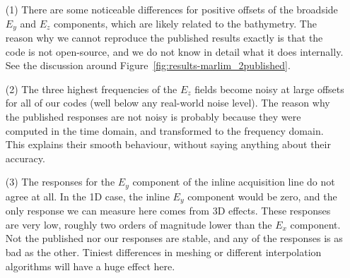 \documentclass[extra, camera,%
]{gji}
\begin{document}
\begin{enumerate}
  \item[(1)] There are some noticeable differences for positive offsets of the broadside $E_y$ and $E_z$ components, which are likely related to the bathymetry. The reason why we cannot reproduce the published results exactly is that the code is not open-source, and we do not know in detail what it does internally. See the discussion around Figure~\ref{fig:results-marlim_2published}.
  \item[(2)] The three highest frequencies of the $E_z$ fields become noisy at large offsets for all of our codes (well below any real-world noise level). The reason why the published responses are not noisy is probably because they were computed in the time domain, and transformed to the frequency domain. This explains their smooth behaviour, without saying anything about their accuracy.
  \item[(3)] The responses for the $E_y$ component of the inline acquisition line do not agree at all. In the 1D case, the inline $E_y$ component would be zero, and the only response we can measure here comes from 3D effects. These responses are very low, roughly two orders of magnitude lower than the $E_x$ component. Not the published nor our responses are stable, and any of the responses is as bad as the other. Tiniest differences in meshing or different interpolation algorithms will have a huge effect here.
\end{enumerate}
\end{document}
